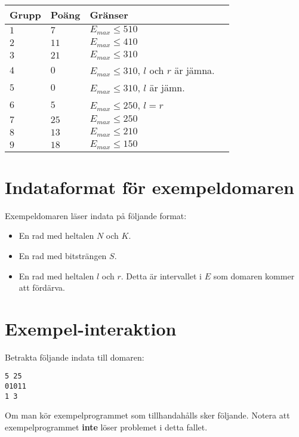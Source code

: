 \noindent
\begin{tabular}{| l | l | l | l |}
  \hline
  \textbf{Grupp} & \textbf{Poäng} & \textbf{Gränser} \\ \hline
  $1$   & $7$        & $E_{max} \leq 510$ \\ \hline
  $2$   & $11$       & $E_{max} \leq 410$ \\ \hline
  $3$   & $21$       & $E_{max} \leq 310$ \\ \hline
  $4$   & $0$        & $E_{max} \leq 310$, $l$ och $r$ är jämna. \\ \hline
  $5$   & $0$        & $E_{max} \leq 310$, $l$ är jämn. \\ \hline
  $6$   & $5$        & $E_{max} \leq 250$, $l=r$ \\ \hline
  $7$   & $25$       & $E_{max} \leq 250$ \\ \hline
  $8$   & $13$       & $E_{max} \leq 210$ \\ \hline
  $9$   & $18$       & $E_{max} \leq 150$ \\ \hline
\end{tabular}

\section*{Indataformat för exempeldomaren}
Exempeldomaren läser indata på följande format:
\begin{itemize}
  \item En rad med heltalen $N$ och $K$.
  \item En rad med bitsträngen $S$.
  \item En rad med heltalen $l$ och $r$. Detta är intervallet i $E$ som domaren kommer att fördärva.
\end{itemize}


\section*{Exempel-interaktion}

Betrakta följande indata till domaren:
\begin{verbatim}
5 25
01011
1 3
\end{verbatim}

Om man kör exempelprogrammet som tillhandahålls sker följande. Notera att exempelprogrammet
\textbf{inte} löser problemet i detta fallet.

